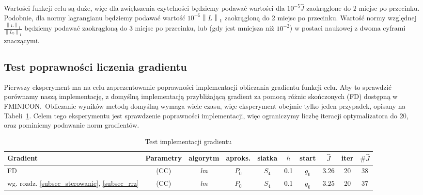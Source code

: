 \documentclass[licencjacka]{pracamgr}
\newcommand{\norm}[1]{\left\lVert#1\right\rVert}
\begin{document}
Wartości funkcji celu są duże, więc dla zwiększenia czytelności będziemy podawać wartości dla $10^{-5}\hat{J}$ zaokrąglone do 2 miejsc po przecinku. Podobnie, dla normy lagrangianu będziemy podawać wartość $10^{-5}\norm{L}_1$ zaokrągloną do 2 miejsc po przecinku. Wartość normy względnej $\frac{\norm{L}_1}{\norm{L_0}_1}$ będziemy podawać zaokrągloną do 3 miejsc po przecinku, lub (gdy jest mniejsza niż $10^{-2}$) w postaci naukowej z dwoma cyframi znaczącymi.

\subsection{Test poprawności liczenia gradientu}
Pierwszy eksperyment ma na celu zaprezentowanie poprawności implementacji obliczania gradientu funkcji celu. Aby to sprawdzić porównamy naszą implementację, z domyślną implementacją przybliżającą gradient za pomocą różnic skończonych (FD) dostępną w FMINICON.\ Obliczanie wyników metodą domyślną wymaga wiele czasu, więc eksperyment obejmie tylko jeden przypadek, opisany na Tabeli~\ref{test_tbl}. Celem tego eksperymentu jest sprawdzenie poprawności implementacji, więc ograniczymy liczbę iteracji optymalizatora do 20, oraz pominiemy podawanie norm gradientów.
\begin{table}[h]
  \begin{center}
    \begin{tabular}{|p{1.7cm}|c|c|c|c|c|c|c|c|c|}
      \hline
      Gradient & Parametry & algorytm & aproks. & siatka & $h$ & start & $\hat{J}$ & iter & $\#\hat{J}$ \\
      \hline
      FD & (CC) & {\it lm\/} & $P_0$ & $S_4$ & 0.1 & $g_0$ & $3.26$ & 20 & 38 \\
      \hline
      wg. rozdz. \ref{subsec_sterowanie}, \ref{subsec_rrz} & (CC) & {\it lm\/} & $P_0$ & $S_4$ & 0.1 & $g_0$ & $3.25$ & 20 & 37 \\
      \hline
    \end{tabular}
    \caption{Test implementacji gradientu}\label{test_tbl}
  \end{center}
\end{table}
\end{document}
